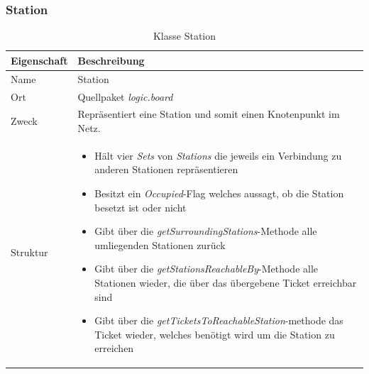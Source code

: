         \subsubsection{Station}
            \begin{table}[H]
                \caption{Klasse Station}
                \begin{tabular}{p{2.5cm}  p{9.5cm}} 
                    \hline
                    \textbf{Eigenschaft} & \textbf{Beschreibung}\\
                    \hline
                    Name & Station\\
                    Ort & Quellpaket \textit{logic.board}\\
                    \hline
                    Zweck &
                    Repräsentiert eine Station und somit einen Knotenpunkt im Netz.
                    \\
                    \hline
                    Struktur &
                    \begin{itemize}
                        \itemsep0em
                        \item Hält vier \textit{Sets} von \textit{Stations} die jeweils ein Verbindung zu anderen Stationen repräsentieren
                        \item Besitzt ein \textit{Occupied}-Flag welches aussagt, ob die Station besetzt ist oder nicht
                        \item Gibt über die \textit{getSurroundingStations}-Methode alle umliegenden Stationen zurück
                        \item Gibt über die \textit{getStationsReachableBy}-Methode alle Stationen wieder, die über das übergebene Ticket erreichbar sind
                        \item Gibt über die \textit{getTicketsToReachableStation}-methode das Ticket wieder, welches benötigt wird um die Station zu erreichen
                    \end{itemize}
                    \\
                    \hline
                \end{tabular}
            \end{table}


